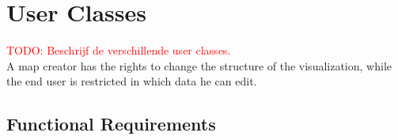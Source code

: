 \section{User Classes}\label{sec:user-classes}
\textcolor{red}{TODO: Beschrijf de verschillende user classes.}\\
A map creator has the rights to change the structure of the visualization, while the end user is restricted in which data he can edit.

\subsection{Functional Requirements}\label{sec:functional-requirements}

